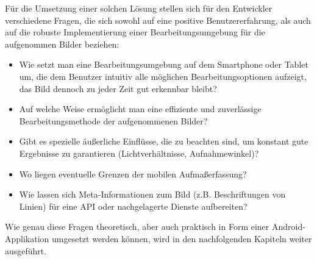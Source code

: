 \noindent
Für die Umsetzung einer solchen Lösung stellen sich für den Entwickler verschiedene Fragen, die sich sowohl auf eine positive Benutzererfahrung, als auch auf die robuste Implementierung einer Bearbeitungsumgebung für die aufgenommen Bilder beziehen:

\begin{itemize}
  \item Wie setzt man eine Bearbeitungsumgebung auf dem Smartphone oder Tablet um, die dem Benutzer intuitiv alle möglichen Bearbeitungsoptionen aufzeigt, das Bild dennoch zu jeder Zeit gut erkennbar bleibt?
  \item Auf welche Weise ermöglicht man eine effiziente und zuverlässige Bearbeitungsmethode der aufgenommenen Bilder?
  \item Gibt es spezielle äußerliche Einflüsse, die zu beachten sind, um konstant gute Ergebnisse zu garantieren (Lichtverhältnisse, Aufnahmewinkel)?
  \item Wo liegen eventuelle Grenzen der mobilen Aufmaßerfassung?
  \item Wie lassen sich Meta-Informationen zum Bild (z.B. Beschriftungen von Linien) für eine API oder nachgelagerte Dienste aufbereiten?
\end{itemize}

\noindent
Wie genau diese Fragen theoretisch, aber auch praktisch in Form einer Android-Applikation umgesetzt werden können, wird in den nachfolgenden Kapiteln weiter ausgeführt.
